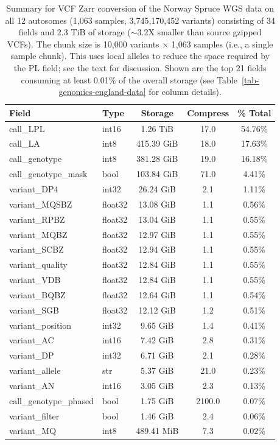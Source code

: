 \documentclass[a4paper,num-refs]{oup-contemporary}
\begin{document}
\begin{table}
\caption{Summary for VCF Zarr conversion of the Norway Spruce
WGS data on all 12 autosomes (1,063 samples, 
3,745,170,452 variants)
consisting of 34 fields and 2.3 TiB of storage ($\sim 3.2$X smaller 
than source gzipped VCFs). The chunk size is 10,000 variants $\times$
1,063 samples (i.e., a single sample chunk). This uses local 
alleles to reduce the 
space required by the PL field; see the text for discussion.
Shown are the top 21 fields consuming at least 0.01\% of the 
overall storage (see Table~\ref{tab-genomics-england-data} for column details).
\label{tab-spruce-data}}
\begin{tabular}{llS[table-format=3.2]S[table-format=3.2]S[table-format=3.2]}
\toprule
{Field} & {Type} & {Storage} & {Compress} & {\% Total} \\
\midrule
call\_LPL & int16 & 1.26 TiB & 17.0 & 54.76\% \\
call\_LA & int8 & 415.39 GiB & 18.0 & 17.63\% \\
call\_genotype & int8 & 381.28 GiB & 19.0 & 16.18\% \\
call\_genotype\_mask & bool & 103.84 GiB & 71.0 & 4.41\% \\
variant\_DP4 & int32 & 26.24 GiB & 2.1 & 1.11\% \\
variant\_MQSBZ & float32 & 13.08 GiB & 1.1 & 0.56\% \\
variant\_RPBZ & float32 & 13.04 GiB & 1.1 & 0.55\% \\
variant\_MQBZ & float32 & 12.97 GiB & 1.1 & 0.55\% \\
variant\_SCBZ & float32 & 12.94 GiB & 1.1 & 0.55\% \\
variant\_quality & float32 & 12.84 GiB & 1.1 & 0.55\% \\
variant\_VDB & float32 & 12.84 GiB & 1.1 & 0.55\% \\
variant\_BQBZ & float32 & 12.64 GiB & 1.1 & 0.54\% \\
variant\_SGB & float32 & 12.12 GiB & 1.2 & 0.51\% \\
variant\_position & int32 & 9.65 GiB & 1.4 & 0.41\% \\
variant\_AC & int16 & 7.42 GiB & 2.8 & 0.31\% \\
variant\_DP & int32 & 6.71 GiB & 2.1 & 0.28\% \\
variant\_allele & str & 5.37 GiB & 21.0 & 0.23\% \\
variant\_AN & int16 & 3.05 GiB & 2.3 & 0.13\% \\
call\_genotype\_phased & bool & 1.75 GiB & 2100.0 & 0.07\% \\
variant\_filter & bool & 1.46 GiB & 2.4 & 0.06\% \\
variant\_MQ & int8 & 489.41 MiB & 7.3 & 0.02\% \\
\bottomrule
\end{tabular}
\end{table}
\end{document}
